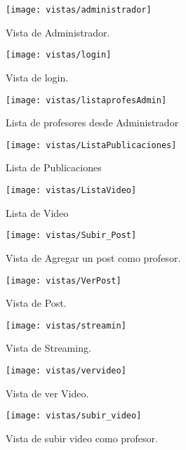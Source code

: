 \documentclass[12pt]{article}
\begin{document}
\begin{figure}
  \centering
      \texttt{[image: vistas/administrador]}
	    \caption{Vista de Administrador.}
	\label{fig:Admin}
\end{figure}

\begin{figure}
  \centering
      \texttt{[image: vistas/login]}
	    \caption{Vista de login.}
	\label{fig:login}
\end{figure}

\begin{figure}
  \centering
      \texttt{[image: vistas/listaprofesAdmin]}
	    \caption{Lista de profesores desde Administrador}
	\label{fig:lista_prof_admin}
\end{figure}

\begin{figure}
  \centering
      \texttt{[image: vistas/ListaPublicaciones]}
	    \caption{Lista de Publicaciones}
	\label{fig:lista_pub}
\end{figure}

\begin{figure}
  \centering
      \texttt{[image: vistas/ListaVideo]}
	    \caption{Lista de Video}
	\label{fig:lista_vid}
\end{figure}

\begin{figure}
  \centering
      \texttt{[image: vistas/Subir\_Post]}
	    \caption{Vista de Agregar un post como profesor.}
	\label{fig:add_post}
\end{figure}

\begin{figure}
  \centering
      \texttt{[image: vistas/VerPost]}
	    \caption{Vista de Post.}
	\label{fig:ver_post}
\end{figure}

\begin{figure}
  \centering
      \texttt{[image: vistas/streamin]}
	    \caption{Vista de Streaming.}
	\label{fig:streaming}
\end{figure}

\begin{figure}
  \centering
      \texttt{[image: vistas/vervideo]}
	    \caption{Vista de ver Video.}
	\label{fig:ver_video}
\end{figure}


\begin{figure}
  \centering
      \texttt{[image: vistas/subir\_video]}
	    \caption{Vista de subir video como profesor.}
	\label{fig:add_video}
\end{figure}
\end{document}
